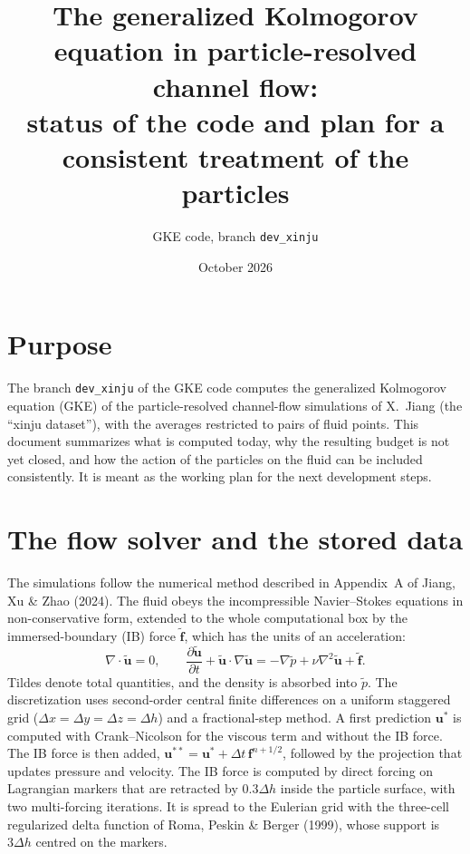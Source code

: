 \documentclass[11pt,a4paper]{article}
\title{The generalized Kolmogorov equation in particle-resolved channel flow:\\
status of the code and plan for a consistent treatment of the particles}
\author{GKE code, branch \texttt{dev\_xinju}}
\date{October 2026}
\newcommand{\vect}[1]{\boldsymbol{#1}}
\begin{document}
\maketitle

\section{Purpose}

The branch \texttt{dev\_xinju} of the GKE code computes the generalized
Kolmogorov equation (GKE) of the particle-resolved channel-flow simulations of
X.~Jiang (the ``xinju dataset''), with the averages restricted to pairs of
fluid points. This document summarizes what is computed today, why the
resulting budget is not yet closed, and how the action of the particles on the
fluid can be included consistently. It is meant as the working plan for the
next development steps.

\section{The flow solver and the stored data}
\label{sec:solver}

The simulations follow the numerical method described in Appendix~A of
Jiang, Xu \& Zhao (2024). The fluid obeys the incompressible Navier--Stokes
equations in non-conservative form, extended to the whole computational box by
the immersed-boundary (IB) force $\tilde{\vect f}$, which has the units of an
acceleration:
\begin{equation}
  \nabla\cdot\tilde{\vect u}=0,\qquad
  \frac{\partial\tilde{\vect u}}{\partial t}+\tilde{\vect u}\cdot\nabla\tilde{\vect u}
  =-\nabla\tilde p+\nu\nabla^2\tilde{\vect u}+\tilde{\vect f}.
  \label{eq:ns}
\end{equation}
Tildes denote total quantities, and the density is absorbed into $\tilde p$. The
discretization uses second-order central finite differences on a uniform
staggered grid ($\Delta x=\Delta y=\Delta z=\Delta h$) and a fractional-step
method. A first prediction $\vect u^*$ is computed with Crank--Nicolson for the
viscous term and without the IB force. The IB force is then added,
$\vect u^{**}=\vect u^*+\Delta t\,\vect f^{n+1/2}$, followed by the projection
that updates pressure and velocity. The IB force is computed by direct forcing
on Lagrangian markers that are retracted by $0.3\Delta h$ inside the particle
surface, with two multi-forcing iterations. It is spread to the Eulerian grid
with the three-cell regularized delta function of Roma, Peskin \& Berger
(1999), whose support is $3\Delta h$ centred on the markers.
\end{document}

